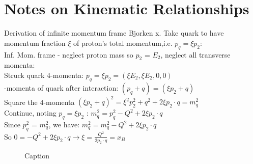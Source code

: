 \chapter{Notes on Kinematic Relationships}


Derivation of infinite momentum frame Bjorken x. Take quark to have momentum fraction $\xi$ of proton's total momentum,i.e. $p_q = \xi p_2$:\\
            \indent Inf. Mom. frame - neglect proton mass so $p_2$ = $E_2$, neglect all transverse momenta:\\
            \indent Struck quark 4-momenta: $p_q = \xi p_2 = (\xi E_2, \xi E_2, 0, 0)$\\
            -momenta of quark after interaction: $(p_q + q) = (\xi p_2 +q)$\\
            \indent Square the 4-momenta $(\xi p_2 +q)^2 = \xi^2 p_2^2 +q^2 + 2\xi p_2 \cdot q  = m_q^2$\\
            \indent Continue, noting $p_q = \xi p_2$ : $m_q^2 = p_q^2 - Q^2 + 2 \xi p_2 \cdot q$\\
            \indent Since $p_q^2$ = $m_q^2$, we have: $m_q^2 = m_q^2 -Q^2 + 2 \xi p_2 \cdot q$\\
            \indent So $0 = -Q^2 + 2\xi p_2 \cdot q \longrightarrow \xi = \frac{Q^2}{2 p_2 \cdot q} = x_B$\\


\begin{figure}
    \centering
    \caption{Caption}
    \label{fig:kinematic_curves}
\end{figure}